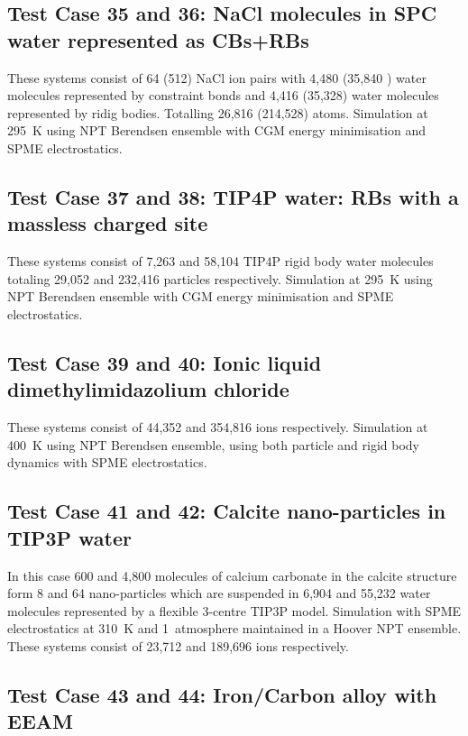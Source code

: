 \subsection{Test Case 35 and 36: NaCl molecules in SPC water represented as CBs+RBs}

These systems consist of 64 (512) NaCl ion pairs with 4,480 (35,840
) water molecules represented by constraint bonds and 4,416 (35,328)
water molecules represented by ridig bodies.  Totalling 26,816 (214,528)
atoms.  Simulation at 295~K using NPT Berendsen ensemble with CGM energy
minimisation and SPME electrostatics.

\subsection{Test Case 37 and 38: TIP4P water: RBs with a massless charged site}

These systems consist of 7,263 and 58,104 TIP4P rigid body water molecules
totaling 29,052 and 232,416 particles respectively.  Simulation at 295~K
using NPT Berendsen ensemble with CGM energy minimisation and SPME electrostatics.

\subsection{Test Case 39 and 40: Ionic liquid dimethylimidazolium chloride}

These systems consist of 44,352 and 354,816 ions respectively.  Simulation
at 400~K using NPT Berendsen ensemble, using both particle and rigid body
dynamics with SPME electrostatics.

\subsection{Test Case 41 and 42: Calcite nano-particles in TIP3P water}

In this case 600 and 4,800 molecules of calcium carbonate in the calcite
structure form 8 and 64 nano-particles which are suspended in 6,904 and
55,232 water molecules represented by a flexible 3-centre TIP3P model.
Simulation with SPME electrostatics at 310~K and 1~atmosphere maintained
in a Hoover NPT ensemble.  These systems consist of 23,712 and 189,696
ions respectively.

\subsection{Test Case 43 and 44: Iron/Carbon alloy with EEAM}

